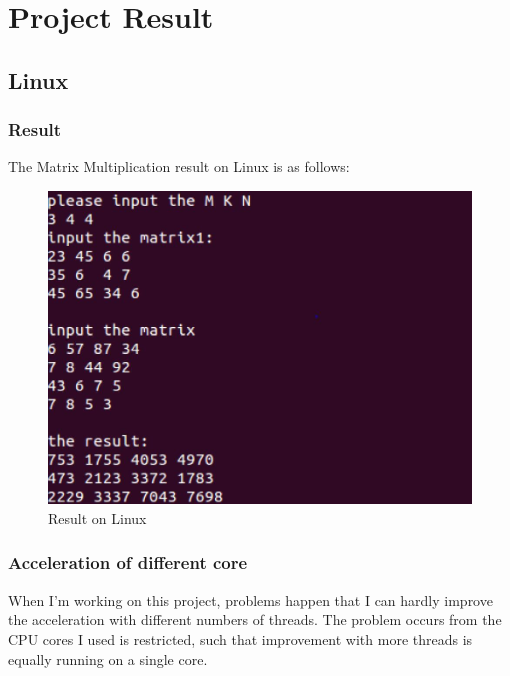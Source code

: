 \documentclass[12pt,a4paper]{article}
\begin{document}
\section{Project Result}
\subsection{Linux}
\subsubsection{Result}
The Matrix Multiplication result on Linux is as follows:
\begin{figure}[H]
	\centering
	\includegraphics[scale= 0.4]{./fig/linux_result.jpg}
	\caption{Result on Linux}
	\label{fig::linux result}
\end{figure}

\subsubsection{Acceleration of different core}
When I'm working on this project, problems happen that I can hardly improve the acceleration with different numbers of threads. The problem occurs from the CPU cores I used is restricted, such that improvement with more threads is equally running on a single core.
\end{document}
